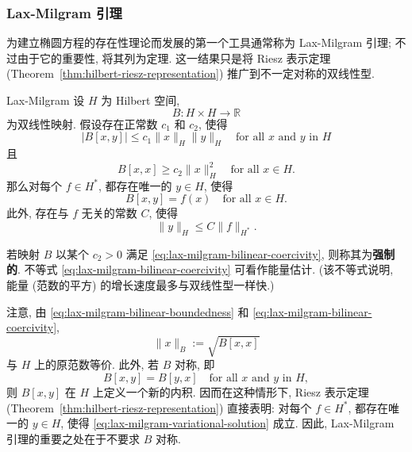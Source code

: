 \subsubsection{Lax-Milgram 引理}\label{subsec:lax-milgram-lemma}

为建立椭圆方程的存在性理论而发展的第一个工具通常称为 Lax-Milgram 引理; 不过由于它的重要性, 将其列为定理. 这一结果只是将 Riesz 表示定理 (Theorem~\ref{thm:hilbert-riesz-representation}) 推广到不一定对称的双线性型.

\begin{Theorem}{Lax-Milgram}
\label{thm:lax-milgram}
设 $H$ 为 Hilbert 空间,
\begin{equation}\label{eq:lax-milgram-bilinear-mapping-domain}
B:H\times H\to\mathbb{R}
\end{equation}
为双线性映射. 假设存在正常数 $c_1$ 和 $c_2$, 使得
\begin{equation}\label{eq:lax-milgram-bilinear-boundedness}
|B[x,y]|\leq c_1\|x\|_H\|y\|_H\quad\text{for all }x\text{ and }y\text{ in }H
\end{equation}
且
\begin{equation}\label{eq:lax-milgram-bilinear-coercivity}
B[x,x]\geq c_2\|x\|_H^2\quad\text{for all }x\in H.
\end{equation}
那么对每个 $f\in H^*$, 都存在唯一的 $y\in H$, 使得
\begin{equation}\label{eq:lax-milgram-variational-solution}
B[x,y]=f(x)\quad\text{for all }x\in H.
\end{equation}
此外, 存在与 $f$ 无关的常数 $C$, 使得
\begin{equation}\label{eq:lax-milgram-solution-dual-norm-bound}
\|y\|_H\leq C\|f\|_{H^*}.
\end{equation}

\end{Theorem}

\begin{Remark}
\label{rem:coercive-form-energy-estimate}
若映射 $B$ 以某个 $c_2>0$ 满足 \eqref{eq:lax-milgram-bilinear-coercivity}, 则称其为\textbf{强制的}. 不等式 \eqref{eq:lax-milgram-bilinear-coercivity} 可看作能量估计. (该不等式说明, 能量 (范数的平方) 的增长速度最多与双线性型一样快.)
\end{Remark}

\begin{Remark}
\label{rem:lax-milgram-nonsymmetric-significance}
注意, 由 \eqref{eq:lax-milgram-bilinear-boundedness} 和 \eqref{eq:lax-milgram-bilinear-coercivity},
\begin{equation}\label{eq:coercive-bilinear-induced-equivalent-norm}
\|x\|_B:=\sqrt{B[x,x]}
\end{equation}
与 $H$ 上的原范数等价. 此外, 若 $B$ 对称, 即
\begin{equation}\label{eq:symmetric-bilinear-form-condition}
B[x,y]=B[y,x]\quad\text{for all }x\text{ and }y\text{ in }H,
\end{equation}
则 $B[x,y]$ 在 $H$ 上定义一个新的内积. 因而在这种情形下, Riesz 表示定理 (Theorem~\ref{thm:hilbert-riesz-representation}) 直接表明: 对每个 $f\in H^*$, 都存在唯一的 $y\in H$, 使得 \eqref{eq:lax-milgram-variational-solution} 成立. 因此, Lax-Milgram 引理的重要之处在于不要求 $B$ 对称.
\end{Remark}

